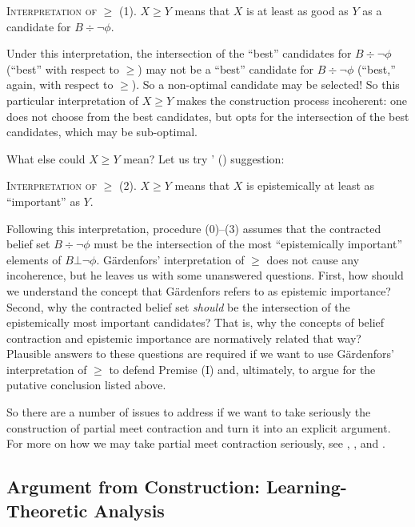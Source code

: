 	\xm \textsc{Interpretation of $\ge$ (1).} $X \ge Y$ means that $X$ is at least as good as $Y$ as a candidate for $B \div \neg\phi$.

\ed Under this interpretation, the intersection of the ``best'' candidates for $B \div \neg\phi$ (``best'' with respect to $\geq$) may not be a ``best'' candidate for $B \div \neg\phi$ (``best,'' again, with respect to $\geq$). So a non-optimal candidate may be selected! So this particular interpretation of $X \ge Y$ makes the construction process incoherent: one does not choose from the best candidates, but opts for the intersection of the best candidates, which may be sub-optimal.  

What else could $X \ge Y$ mean? Let us try \citeauthor{gardenfors1984epistemic}' () suggestion:\op

	\xm \textsc{Interpretation of $\ge$ (2).} $X \ge Y$ means that $X$ is epistemically at least as ``important'' as $Y$.

\ed Following this interpretation, procedure ($0$)--($3$) assumes that the contracted belief set $B \div \neg\phi$ must be the intersection of the most ``epistemically important'' elements of $B\bot\neg\phi$. G\"{a}rdenfors' interpretation of $\ge$ does not cause any incoherence, but he leaves us with some unanswered questions. First, how should we understand the concept that G\"{a}rdenfors refers to as epistemic importance? Second, why the contracted belief set {\em should} be the intersection of the epistemically most important candidates? That is, why the concepts of belief contraction and epistemic importance are normatively related that way? Plausible answers to these questions are required if we want to use G\"{a}rdenfors' interpretation of $\ge$ to defend Premise (I) and, ultimately, to argue for the putative conclusion listed above.


So there are a number of issues to address if we want to take seriously the construction of partial meet contraction and turn it into an explicit argument. For more on how we may take partial meet contraction seriously, see \citet{gardenfors1984epistemic}, \citet{levi2004mild}, and \citet{arlo2006contraction}.


\subsection{Argument from Construction: Learning-Theoretic Analysis}\label{sec-arg-construction-2}



